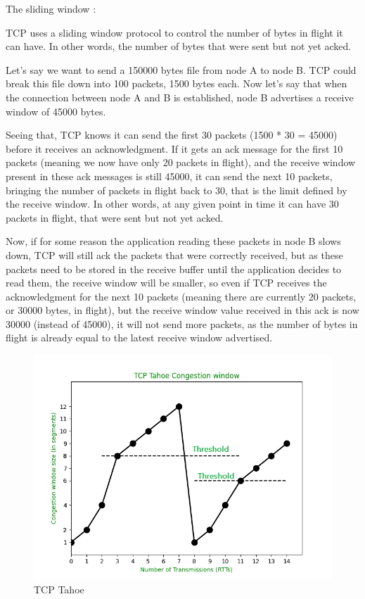 \documentclass[11pt]{article}
\begin{document}
The sliding window : 

TCP uses a sliding window protocol to control the number of bytes in flight it can have. In other words, the number of bytes that were sent but not yet acked.

Let’s say we want to send a 150000 bytes file from node A to node B. TCP could break this file down into 100 packets, 1500 bytes each. Now let’s say that when the connection between node A and B is established, node B advertises a receive window of 45000 bytes.

Seeing that, TCP knows it can send the first 30 packets (1500 * 30 = 45000) before it receives an acknowledgment. If it gets an ack message for the first 10 packets (meaning we now have only 20 packets in flight), and the receive window present in these ack messages is still 45000, it can send the next 10 packets, bringing the number of packets in flight back to 30, that is the limit defined by the receive window. In other words, at any given point in time it can have 30 packets in flight, that were sent but not yet acked.

Now, if for some reason the application reading these packets in node B slows down, TCP will still ack the packets that were correctly received, but as these packets need to be stored in the receive buffer until the application decides to read them, the receive window will be smaller, so even if TCP receives the acknowledgment for the next 10 packets (meaning there are currently 20 packets, or 30000 bytes, in flight), but the receive window value received in this ack is now 30000 (instead of 45000), it will not send more packets, as the number of bytes in flight is already equal to the latest receive window advertised.

  \begin{figure}[!h]
\centering
\includegraphics[width=\textwidth]{tahoecongestionwindow1.png}
\caption{ TCP Tahoe }
\end{figure}
\FloatBarrier
\end{document}
